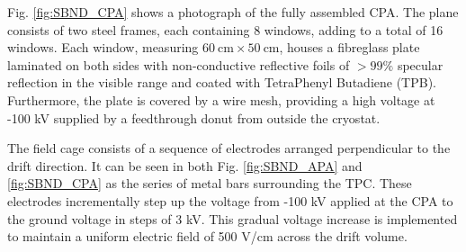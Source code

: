 Fig. \ref{fig:SBND_CPA} shows a photograph of the fully assembled CPA.                                                                                                                                 
The plane consists of two steel frames, each containing 8 windows, adding to a total of 16 windows.
Each window, measuring $60~\mathrm{cm} \times 50~\mathrm{cm}$, houses a fibreglass plate laminated on both sides with non-conductive reflective foils of $> 99\%$ specular reflection in the visible range and coated with TetraPhenyl Butadiene (TPB).
Furthermore, the plate is covered by a wire mesh, providing a high voltage at -100 kV supplied by a feedthrough donut from outside the cryostat.

The field cage consists of a sequence of electrodes arranged perpendicular to the drift direction.
It can be seen in both Fig. \ref{fig:SBND_APA} and \ref{fig:SBND_CPA} as the series of metal bars surrounding the TPC.
These electrodes incrementally step up the voltage from -100 kV applied at the CPA to the ground voltage in steps of 3 kV. 
This gradual voltage increase is implemented to maintain a uniform electric field of 500 V/cm across the drift volume.

